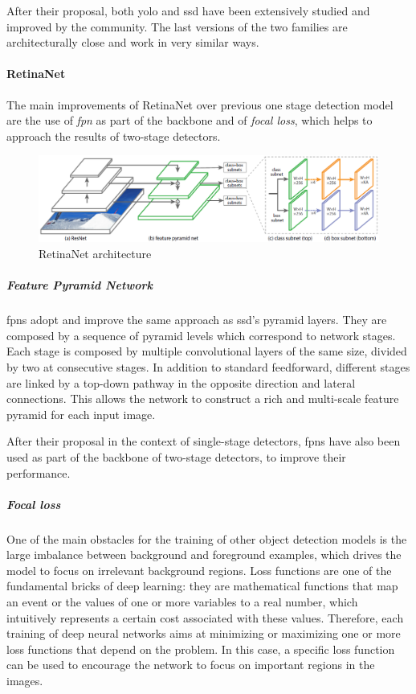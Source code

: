 \documentclass[%
    corpo=12pt,
    twoside,
    stile=classica,   
    tipotesi=magistrale,
    evenboxes,
    english
]{toptesi}
\begin{document}
After their proposal, both \gls{yolo} and \gls{ssd} have been extensively studied and improved by the community. The last versions of the two families are architecturally close and work in very similar ways.

\paragraph{RetinaNet}
The main improvements of RetinaNet\cite{lin2018focal} over previous one stage detection model are the use of \textit{\acrfull{fpn}} as part of the backbone and of \textit{focal loss}, which helps to approach the results of two-stage detectors.

\begin{figure}[ht!]
	\centering
	\includegraphics[width=0.8\linewidth]{imgs/retinanet.png}
	\caption{RetinaNet architecture\cite{lin2018focal}}
	\label{fig:retinanet}
\end{figure}

\subparagraph{Feature Pyramid Network}
\glspl{fpn}\cite{lin2017feature} adopt and improve the same approach as \acrshort{ssd}'s pyramid layers. They are composed by a sequence of pyramid levels which correspond to network stages. Each stage is composed by multiple convolutional layers of the same size, divided by two at consecutive stages. In addition to standard feedforward, different stages are linked by a top-down pathway in the opposite direction and lateral connections. This allows the network to construct a rich and multi-scale feature pyramid for each input image.

After their proposal in the context of single-stage detectors, \glspl{fpn} have also been used as part of the backbone of two-stage detectors, to improve their performance.

\subparagraph{Focal loss}
One of the main obstacles for the training of other object detection models is the large imbalance between background and foreground examples, which drives the model to focus on irrelevant background regions. Loss functions are one of the fundamental bricks of deep learning: they are mathematical functions that map an event or the values of one or more variables to a real number, which intuitively represents a certain cost associated with these values. Therefore, each training of deep neural networks aims at minimizing or maximizing one or more loss functions that depend on the problem. In this case, a specific loss function can be used to encourage the network to focus on important regions in the images.
\end{document}
